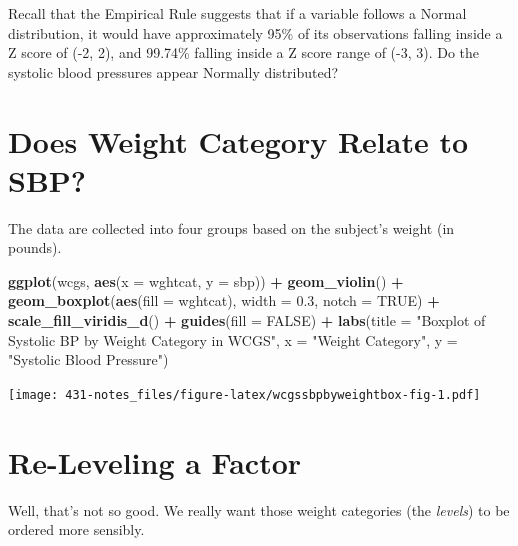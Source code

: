 \documentclass[
]{book}
\newenvironment{Shaded}{\begin{snugshade}}{\end{snugshade}}
\newcommand{\DataTypeTok}[1]{\textcolor[rgb]{0.13,0.29,0.53}{#1}}
\newcommand{\FloatTok}[1]{\textcolor[rgb]{0.00,0.00,0.81}{#1}}
\newcommand{\KeywordTok}[1]{\textcolor[rgb]{0.13,0.29,0.53}{\textbf{#1}}}
\newcommand{\NormalTok}[1]{#1}
\newcommand{\OperatorTok}[1]{\textcolor[rgb]{0.81,0.36,0.00}{\textbf{#1}}}
\newcommand{\OtherTok}[1]{\textcolor[rgb]{0.56,0.35,0.01}{#1}}
\newcommand{\StringTok}[1]{\textcolor[rgb]{0.31,0.60,0.02}{#1}}
\begin{document}
Recall that the Empirical Rule suggests that if a variable follows a Normal distribution, it would have approximately 95\% of its observations falling inside a Z score of (-2, 2), and 99.74\% falling inside a Z score range of (-3, 3). Do the systolic blood pressures appear Normally distributed?

\hypertarget{does-weight-category-relate-to-sbp}{%
\section{Does Weight Category Relate to SBP?}\label{does-weight-category-relate-to-sbp}}

The data are collected into four groups based on the subject's weight (in pounds).

\begin{Shaded}
\begin{Highlighting}[]
\KeywordTok{ggplot}\NormalTok{(wcgs, }\KeywordTok{aes}\NormalTok{(}\DataTypeTok{x =}\NormalTok{ wghtcat, }\DataTypeTok{y =}\NormalTok{ sbp)) }\OperatorTok{+}
\StringTok{    }\KeywordTok{geom_violin}\NormalTok{() }\OperatorTok{+}
\StringTok{    }\KeywordTok{geom_boxplot}\NormalTok{(}\KeywordTok{aes}\NormalTok{(}\DataTypeTok{fill =}\NormalTok{ wghtcat), }\DataTypeTok{width =} \FloatTok{0.3}\NormalTok{, }\DataTypeTok{notch =} \OtherTok{TRUE}\NormalTok{) }\OperatorTok{+}
\StringTok{    }\KeywordTok{scale_fill_viridis_d}\NormalTok{() }\OperatorTok{+}
\StringTok{    }\KeywordTok{guides}\NormalTok{(}\DataTypeTok{fill =} \OtherTok{FALSE}\NormalTok{) }\OperatorTok{+}\StringTok{ }
\StringTok{    }\KeywordTok{labs}\NormalTok{(}\DataTypeTok{title =} \StringTok{"Boxplot of Systolic BP by Weight Category in WCGS"}\NormalTok{, }
         \DataTypeTok{x =} \StringTok{"Weight Category"}\NormalTok{, }\DataTypeTok{y =} \StringTok{"Systolic Blood Pressure"}\NormalTok{)}
\end{Highlighting}
\end{Shaded}

\texttt{[image: 431-notes\_files/figure-latex/wcgssbpbyweightbox-fig-1.pdf]}

\hypertarget{re-leveling-a-factor}{%
\section{Re-Leveling a Factor}\label{re-leveling-a-factor}}

Well, that's not so good. We really want those weight categories (the \emph{levels}) to be ordered more sensibly.
\end{document}
